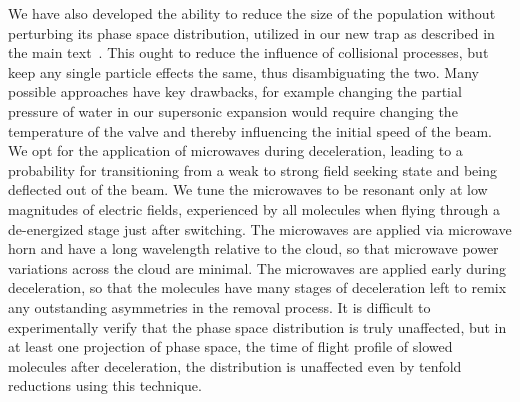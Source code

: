 \documentclass[%
 reprint,
 amsmath,amssymb,
 aps,
prl,
]{revtex4-1}
\begin{document}

We have also developed the ability to reduce the size of the population without perturbing its phase space distribution, utilized in our new trap as described in the main text~\cite{smt}.
This ought to reduce the influence of collisional processes, but keep any single particle effects the same, thus disambiguating the two.
Many possible approaches have key drawbacks, for example changing the partial pressure of water in our supersonic expansion would require changing the temperature of the valve and thereby influencing the initial speed of the beam.
We opt for the application of microwaves during deceleration, leading to a probability for transitioning from a weak to strong field seeking state and being deflected out of the beam.
We tune the microwaves to be resonant only at low magnitudes of electric fields, experienced by all molecules when flying through a de-energized stage just after switching.
The microwaves are applied via microwave horn and have a long wavelength relative to the cloud, so that microwave power variations across the cloud are minimal.
The microwaves are applied early during deceleration, so that the molecules have many stages of deceleration left to remix any outstanding asymmetries in the removal process.
It is difficult to experimentally verify that the phase space distribution is truly unaffected, but in at least one projection of phase space, the time of flight profile of slowed molecules after deceleration, the distribution is unaffected even by tenfold reductions using this technique.
\end{document}
